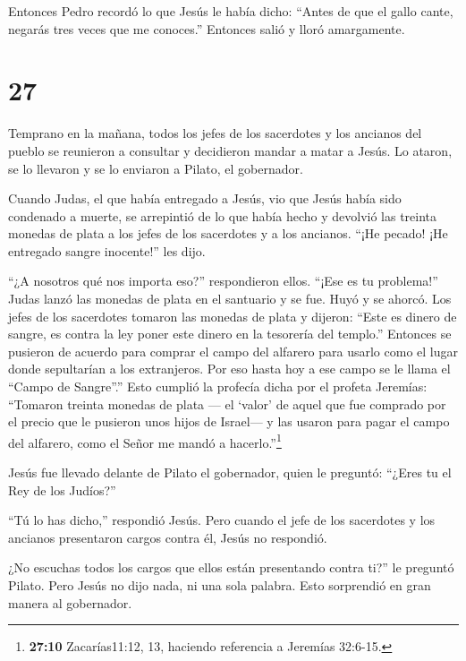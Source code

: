  Entonces Pedro recordó lo que Jesús le había dicho:
``Antes de que el gallo cante, negarás tres veces que me conoces.''
Entonces salió y lloró amargamente.

\hypertarget{section-26}{%
\section{27}\label{section-26}}

 Temprano en la mañana, todos los jefes de los sacerdotes y
los ancianos del pueblo se reunieron a consultar y decidieron mandar a
matar a Jesús.  Lo ataron, se lo llevaron y se lo enviaron a
Pilato, el gobernador.

 Cuando Judas, el que había entregado a Jesús, vio que Jesús
había sido condenado a muerte, se arrepintió de lo que había hecho y
devolvió las treinta monedas de plata a los jefes de los sacerdotes y a
los ancianos.  ``¡He pecado! ¡He entregado sangre
inocente!'' les dijo.

``¿A nosotros qué nos importa eso?'' respondieron ellos. ``¡Ese es tu
problema!''  Judas lanzó las monedas de plata en el
santuario y se fue. Huyó y se ahorcó.  Los jefes de los
sacerdotes tomaron las monedas de plata y dijeron: ``Este es dinero de
sangre, es contra la ley poner este dinero en la tesorería del templo.''
 Entonces se pusieron de acuerdo para comprar el campo del
alfarero para usarlo como el lugar donde sepultarían a los extranjeros.
 Por eso hasta hoy a ese campo se le llama el ``Campo de
Sangre''.''  Esto cumplió la profecía dicha por el profeta
Jeremías: ``Tomaron treinta monedas de plata --- el `valor' de aquel que
fue comprado por el precio que le pusieron unos hijos de Israel---
 y las usaron para pagar el campo del alfarero, como el
Señor me mandó a hacerlo.''\footnote{\textbf{27:10} Zacarías11:12, 13,
  haciendo referencia a Jeremías 32:6-15.}

 Jesús fue llevado delante de Pilato el gobernador, quien
le preguntó: ``¿Eres tu el Rey de los Judíos?''

``Tú lo has dicho,'' respondió Jesús.  Pero cuando el jefe
de los sacerdotes y los ancianos presentaron cargos contra él, Jesús no
respondió.

 ¿No escuchas todos los cargos que ellos están presentando
contra ti?'' le preguntó Pilato.  Pero Jesús no dijo nada,
ni una sola palabra. Esto sorprendió en gran manera al gobernador.

